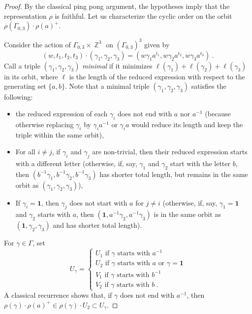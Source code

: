 \documentclass{amsart}
\theoremstyle{plain}
\theoremstyle{definition}
\DeclareMathOperator{\Zb}{\mathbb{Z}}
\newcommand{\1}{\mathbf{1}}
\begin{document}
\begin{proof}
    By the classical ping pong argument, the hypotheses imply that the representation $\rho$ is faithful. Let us characterize the cyclic order on the orbit $\rho(\Gamma_{0,3})\cdot \rho(a)^+$.

Consider the action of $\Gamma_{0,3} \times \Zb^3$ on $(\Gamma_{0,3})^3$ given by
\[(w,t_1,t_2,t_3)\cdot (\gamma_1,\gamma_2,\gamma_3) = (w\gamma_1 a^{t_1} , w\gamma_2 a^{t_2}, w\gamma_3 a^{t_3})~.\]
Call a triple $(\gamma_1,\gamma_2,\gamma_3)$ \emph{minimal} if it minimizes $\ell(\gamma_1)+ \ell(\gamma_2) + \ell(\gamma_3)$ in its orbit, where $\ell$ is the length of the reduced expression with respect to the generating set $\{a,b\}$. Note that a minimal triple $(\gamma_1,\gamma_2,\gamma_3)$ satisfies the following:
\begin{itemize}
    \item the reduced expression of each $\gamma_i$ does not end with $a$ nor $a^{-1}$ (because otherwise replacing $\gamma_i$ by $\gamma_i a^{-1}$ or $\gamma_i a$ would reduce its length and keep the triple within the same orbit),
    \item For all $i\neq j$, if $\gamma_i$ and $\gamma_j$ are non-trivial, then their reduced expression starts with a different letter (otherwise, if, say, $\gamma_1$ and $\gamma_2$ start with the letter $b$, then $(b^{-1}\gamma_1, b^{-1} \gamma_2, b^{-1}\gamma_3)$ has shorter total length, but remains in the same orbit as $(\gamma_1,\gamma_2,\gamma_3)$),
    \item If $\gamma_i = \1$, then $\gamma_j$ does not start with $a$ for $j\neq i$ (otherwise, if, say, $\gamma_1 = \1$ and $\gamma_2$ starts with $a$, then $(\1, a^{-1}\gamma_2, a^{-1} \gamma_3)$ is in the same orbit as $(\1,\gamma_2,\gamma_3)$ and has shorter total length).
    \end{itemize}

    For $\gamma \in \Gamma$, set 
    \[U_\gamma = 
        \begin{cases*}
        U_1\textrm{ if $\gamma$ starts with $a^{-1}$}\\
        U_2\textrm{ if $\gamma$ starts with $a$ or $\gamma = \1$}\\
        V_1\textrm{ if $\gamma$ starts with $b^{-1}$}\\
        V_2\textrm{ if $\gamma$ starts with $b$}~.
        \end{cases*}
    \]
    A classical recurrence shows that, if $\gamma$ does not end with $a^{-1}$, then $\rho(\gamma)\cdot \rho(a)^+ \in \rho(\gamma)\cdot U_2 \subset U_\gamma$.


\end{proof}
\end{document}
